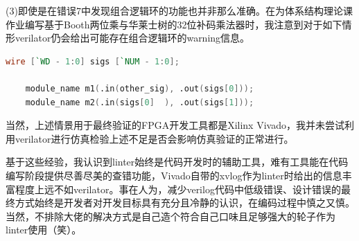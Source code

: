 \documentclass[UTF-8,twoside,c5size]{ctexart}
\begin{document}
	(3)即使是在错误7中发现组合逻辑环的功能也并非那么准确。在为体系结构理论课作业编写基于Booth两位乘与华莱士树的32位补码乘法器时，我注意到对于如下情形verilator仍会给出可能存在组合逻辑环的warning信息。
	\begin{lstlisting}[language=verilog]
	wire [`WD - 1:0] sigs [`NUM - 1:0];
		
	module_name m1(.in(other_sig), .out(sigs[0]));
	module_name m2(.in(sigs[0]  ), .out(sigs[1]));
	\end{lstlisting}
	
	当然，上述情景用于最终验证的FPGA开发工具都是Xilinx Vivado，我并未尝试利用verilator进行仿真检验上述不足是否会影响仿真验证的正常进行。
	
	基于这些经验，我认识到linter始终是代码开发时的辅助工具，难有工具能在代码编写阶段提供尽善尽美的查错功能，Vivado自带的xvlog作为linter时给出的信息丰富程度上远不如verilator。事在人为，减少verilog代码中低级错误、设计错误的最终方式始终是开发者对开发目标具有充分且冷静的认识，在编码过程中慎之又慎。当然，不排除大佬的解决方式是自己造个符合自己口味且足够强大的轮子作为linter使用（笑）。
	
\end{document}
